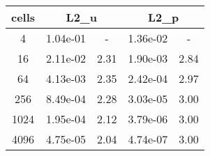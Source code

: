 \documentclass[10pt]{report}
\begin{document}
\begin{table}[H]
\begin{center}
\begin{tabular}{|c|c|c|c|c|} \hline
cells & 
\multicolumn{2}{|c|}{L2_u} & 
\multicolumn{2}{|c|}{L2_p}\\ \hline
4 & 1.04e-01 & - & 1.36e-02 & -\\ \hline
16 & 2.11e-02 & 2.31 & 1.90e-03 & 2.84\\ \hline
64 & 4.13e-03 & 2.35 & 2.42e-04 & 2.97\\ \hline
256 & 8.49e-04 & 2.28 & 3.03e-05 & 3.00\\ \hline
1024 & 1.95e-04 & 2.12 & 3.79e-06 & 3.00\\ \hline
4096 & 4.75e-05 & 2.04 & 4.74e-07 & 3.00\\ \hline
\end{tabular}
\end{center}
\end{table}
\end{document}
